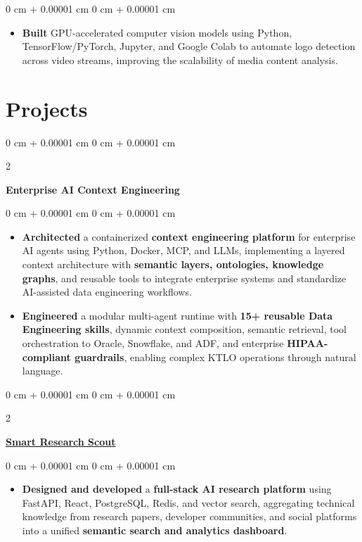 \documentclass[10pt, letterpaper]{article}
\newenvironment{highlights}{
    \begin{itemize}[
        topsep=0.10 cm,
        parsep=0.10 cm,
        partopsep=0pt,
        itemsep=0pt,
        leftmargin=0 cm + 10pt
    ]
}{
    \end{itemize}
}
\newenvironment{onecolentry}{
    \begin{adjustwidth}{
        0 cm + 0.00001 cm
    }{
        0 cm + 0.00001 cm
    }
}{
    \end{adjustwidth}
}
\newenvironment{twocolentry}[2][]{
    \onecolentry
    \def\secondColumn{#2}
    \setcolumnwidth{\fill, 4.5 cm}
    \begin{paracol}{2}
}{
    \switchcolumn \raggedleft \secondColumn
    \end{paracol}
    \endonecolentry
}
\begin{document}
\vspace{0.10 cm}
\begin{onecolentry}
\begin{highlights}
\item \textbf{Built} GPU-accelerated computer vision models using Python, TensorFlow/PyTorch, Jupyter, and Google Colab to automate logo detection across video streams, improving the scalability of media content analysis.
\end{highlights}
\end{onecolentry}

\section{Projects}

\begin{twocolentry}{}
\textbf{Enterprise AI Context Engineering}
\end{twocolentry}

\vspace{0.10 cm}
\begin{onecolentry}
\begin{highlights}
\item \textbf{Architected} a containerized \textbf{context engineering platform} for enterprise AI agents using Python, Docker, MCP, and LLMs, implementing a layered context architecture with \textbf{semantic layers, ontologies, knowledge graphs}, and reusable tools to integrate enterprise systems and standardize AI-assisted data engineering workflows.

\item \textbf{Engineered} a modular multi-agent runtime with \textbf{15+ reusable Data Engineering skills}, dynamic context composition, semantic retrieval, tool orchestration to Oracle, Snowflake, and ADF, and enterprise \textbf{HIPAA-compliant guardrails}, enabling complex KTLO operations through natural language.
\end{highlights}
\end{onecolentry}

\vspace{0.2 cm}

\begin{twocolentry}{}
\textbf{\href{https://github.com/mveer1/AI-research-scout}{Smart Research Scout}}
\end{twocolentry}

\vspace{0.10 cm}
\begin{onecolentry}
\begin{highlights}
\item \textbf{Designed and developed} a \textbf{full-stack AI research platform} using FastAPI, React, PostgreSQL, Redis, and vector search, aggregating technical knowledge from research papers, developer communities, and social platforms into a unified \textbf{semantic search and analytics dashboard}.
\end{highlights}
\end{onecolentry}
\end{document}

